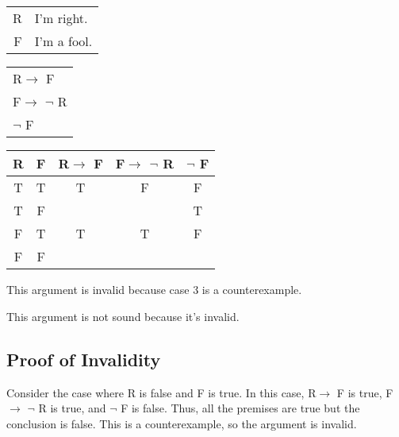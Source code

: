 \section{}
\centering
\begin{tabular}{r l}
    R & I'm right. \\
    F & I'm a fool.
\end{tabular}
\begin{tabular}{l}
    R$\rightarrow$ F\\
    F$\rightarrow$ $\lnot$ R\\
    \hline
    $\lnot$ F
\end{tabular}

\begin{tabular}{c|c||c|c||c}
    R & F & R$\rightarrow$ F & F$\rightarrow$ $\lnot$ R & $\lnot$ F \\
    \hline
    T & T & T & F & F \\
    T & F &   &   & T \\
    F & T & T & T & F \\
    F & F &   &   &  
\end{tabular}

\justifying
\noindent This argument is invalid because case 3 is a counterexample.

\noindent This argument is not sound because it's invalid.

\subsection*{Proof of Invalidity}
Consider the case where R is false and F is true. In this case, R$\rightarrow$ F is true, F$\rightarrow$ $\lnot$ R is true, and $\lnot$ F is false. Thus, all the premises are true but the conclusion is false. This is a counterexample, so the argument is invalid.